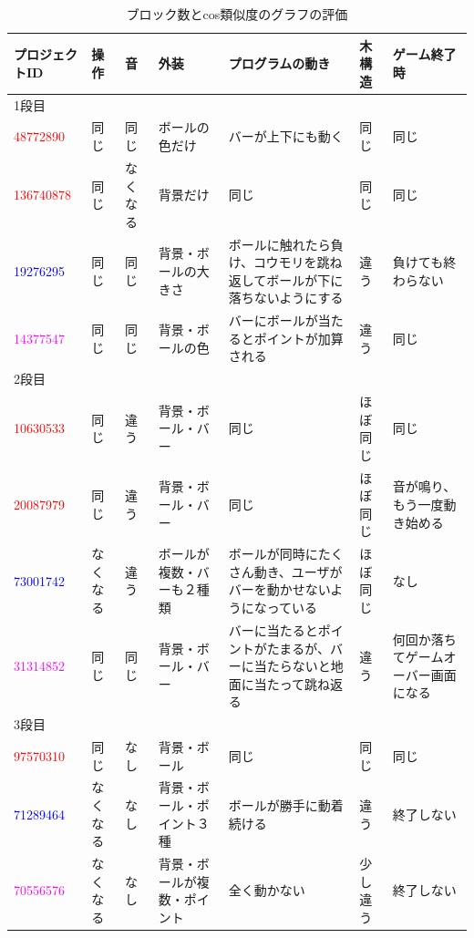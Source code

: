 \documentclass[a4paper,10pt,onecolumn,oneside,openany]{jsbook}
\begin{document}
\begin{table}[h]
 \scriptsize
 \caption{ブロック数とcos類似度のグラフの評価}
 \label{block}
 \begin{center}
\begin{tabular}{|p{1.7cm}||p{1cm}|p{1cm}|p{1.7cm}|p{2cm}|p{1cm}|p{1.7cm}|} \hline

プロジェクトID & 操作 & 音 & 外装 & プログラムの動き & 木構造 & ゲーム終了時 \\ \hline \hline
1段目 &  &  &  &  &  &  \\ \hline
\textcolor{red}{48772890} & 同じ & 同じ & ボールの色だけ & バーが上下にも動く & 同じ & 同じ \\ \hline
\textcolor{red}{136740878} & 同じ & なくなる & 背景だけ & 同じ & 同じ & 同じ \\ \hline
\textcolor{blue}{19276295} & 同じ & 同じ & 背景・ボールの大きさ & ボールに触れたら負け、コウモリを跳ね返してボールが下に落ちないようにする & 違う & 負けても終わらない \\ \hline
\textcolor{magenta}{14377547} & 同じ & 同じ & 背景・ボールの色 & バーにボールが当たるとポイントが加算される & 違う & 同じ \\ \hline

2段目 &  &  &  &  &  &  \\ \hline
\textcolor{red}{10630533} & 同じ & 違う & 背景・ボール・バー & 同じ & ほぼ同じ & 同じ \\ \hline
\textcolor{red}{20087979} & 同じ & 違う & 背景・ボール・バー & 同じ & ほぼ同じ & 音が鳴り、もう一度動き始める \\ \hline
\textcolor{blue}{73001742} & なくなる & 違う & ボールが複数・バーも２種類 & ボールが同時にたくさん動き、ユーザがバーを動かせないようになっている & ほぼ同じ & なし \\ \hline
\textcolor{magenta}{31314852} & 同じ & 同じ & 背景・ボール・バー & バーに当たるとポイントがたまるが、バーに当たらないと地面に当たって跳ね返る & 違う & 何回か落ちてゲームオーバー画面になる \\ \hline

3段目 &  &  &  &  &  &  \\ \hline
\textcolor{red}{97570310} & 同じ & なし & 背景・ボール & 同じ & 同じ & 同じ \\ \hline
\textcolor{blue}{71289464} & なくなる & なし & 背景・ボール・ポイント３種 & ボールが勝手に動着続ける & 違う & 終了しない \\ \hline
\textcolor{magenta}{70556576} & なくなる & なし & 背景・ボールが複数・ポイント & 全く動かない & 少し違う & 終了しない \\ \hline


\end{tabular}
\end{center}
\end{table}
\end{document}
